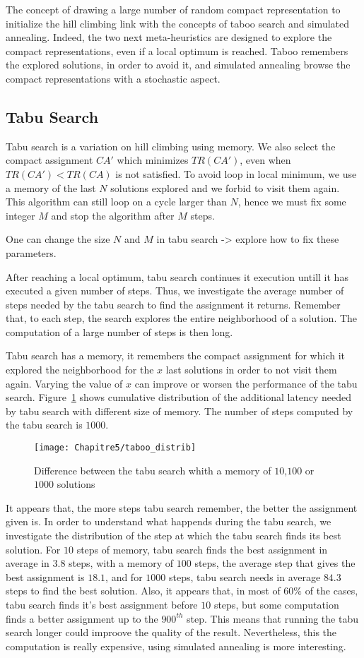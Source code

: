  The concept of drawing a large number of random compact representation to initialize the hill climbing link with the concepts of taboo search and simulated annealing. Indeed, the two next meta-heuristics are designed to explore the compact representations, even if a local optimum is reached. Taboo remembers the explored solutions, in order to avoid it, and simulated annealing browse the compact representations with a stochastic aspect.
\subsection{Tabu Search}

Tabu search is a variation on hill climbing using memory. We also select the compact assignment $CA'$ which minimizes 
$TR(CA')$, even when $TR(CA') < TR(CA)$ is not satisfied. To avoid loop in local minimum, we use a memory of the last 
$N$ solutions explored and we forbid to visit them again. This algorithm can still loop on a cycle larger than $N$,
hence we must fix some integer $M$ and stop the algorithm after $M$ steps.


One can change the size $N$ and $M$ in tabu search -> explore how to fix these parameters. 

After reaching a local optimum, tabu search continues it execution untill it has executed a given number of steps.
Thus, we investigate the average number of steps needed by the tabu search to find the assignment it returns. Remember that, to each step, the search explores the entire neighborhood of a solution. The computation of a large number of steps is then long.

Tabu search has a memory, it remembers the compact assignment for which it explored the neighborhood for the $x$ last solutions in order to not visit them again. Varying the value of $x$ can improve or worsen the performance of the tabu search.
Figure~\ref{fig:tabudistrib} shows cumulative distribution of the additional latency needed by tabu search with different size of memory. The number of steps computed by the tabu search is $1000$.
\begin{figure}[h]
	\centering
	\texttt{[image: Chapitre5/taboo\_distrib]}
\caption{ Difference between the tabu search whith a memory of $10$,$100$ or $1000$ solutions}
\label{fig:tabudistrib}
\end{figure}
It appears that, the more steps tabu search remember, the better the assignment given is.
In order to understand what happends during the tabu search, we investigate the distribution of the step at which the tabu search finds its best solution.
For $10$ steps of memory, tabu search finds the best assignment in average in $3.8$ steps, with a memory of $100$ steps, the average step that gives the best assignment is $18.1$, and for $1000$ steps, tabu search needs in average $84.3$ steps to find the best solution. 
Also, it appears that, in most of $60\%$ of the cases, tabu search finds it's best assignment before $10$ steps, but some computation finds a better assignment up to the $900^{th}$ step. This means that running the tabu search longer could improove the quality of the result. Nevertheless, this the computation is really expensive, using simulated annealing is more interesting.

